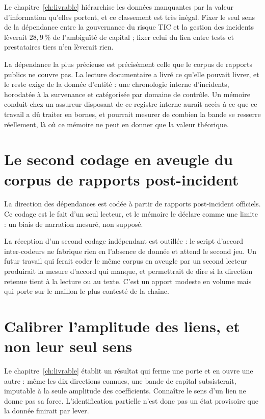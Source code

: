 Le chapitre~\ref{ch:livrable} hiérarchise les données manquantes par la valeur d'information
qu'elles portent, et ce classement est très inégal. Fixer le seul sens de la dépendance entre la
gouvernance du risque TIC et la gestion des incidents lèverait $28{,}9\,\%$ de
l'ambiguïté de capital ; fixer celui du lien entre tests et prestataires tiers n'en lèverait rien.

La dépendance la plus précieuse est précisément celle que le corpus de rapports publics ne couvre
pas. La lecture documentaire a livré ce qu'elle pouvait livrer, et le reste exige de la donnée
d'entité : une chronologie interne d'incidents, horodatée à la survenance et catégorisée par
domaine de contrôle. Un mémoire conduit chez un assureur disposant de ce registre interne aurait
accès à ce que ce travail a dû traiter en bornes, et pourrait mesurer de combien la bande se
resserre réellement, là où ce mémoire ne peut en donner que la valeur théorique.


\section{Le second codage en aveugle du corpus de rapports post-incident}

La direction des dépendances est codée à partir de rapports post-incident officiels. Ce codage est
le fait d'un seul lecteur, et le mémoire le déclare comme une limite : un biais de narration
mesuré, non supposé.

La réception d'un second codage indépendant est outillée : le script d'accord inter-codeurs ne
fabrique rien en l'absence de donnée et attend le second jeu. Un futur travail qui ferait coder le
même corpus en aveugle par un second lecteur produirait la mesure d'accord qui manque, et
permettrait de dire si la direction retenue tient à la lecture ou au texte. C'est un apport modeste
en volume mais qui porte sur le maillon le plus contesté de la chaîne.

\section{Calibrer l'amplitude des liens, et non leur seul sens}

Le chapitre~\ref{ch:livrable} établit un résultat qui ferme une porte et en ouvre une autre : même
les dix directions connues, une bande de capital subsisterait, imputable à la seule amplitude des
coefficients. Connaître le sens d'un lien ne donne pas sa force. L'identification partielle n'est
donc pas un état provisoire que la donnée finirait par lever.

